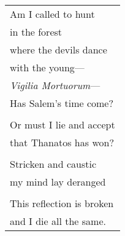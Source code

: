 \documentclass{article}
\begin{document}
\begin{center}
\begin{tabular}{l}
\\
Am I called to hunt  \\
in the forest \\
where the devils dance \\
with the young--- \\
\textit{Vigilia Mortuorum}--- \\ %
Has Salem's time come? \\
\\
Or must I lie and accept \\
that Thanatos has won? \\
\\
Stricken and caustic \\
my mind lay deranged \\
\\
This reflection is broken \\
and I die all the same. \\
\end{tabular}
\end{center}
\end{document}
